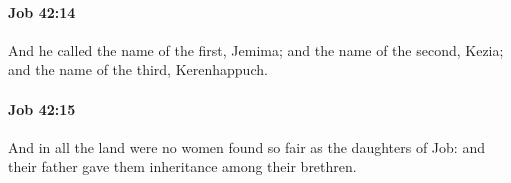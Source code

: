 		\paragraph{Job 42:14} %
			\label{JOB-42-14}

			And he called the name of the first, Jemima; and the name of the second, Kezia; and the name of the third, Kerenhappuch.


		\paragraph{Job 42:15} %
			\label{JOB-42-15}

			And in all the land were no women found so fair as the daughters of Job: and their father gave them inheritance among their brethren.


